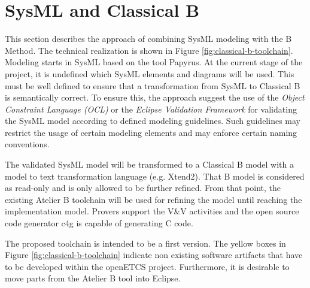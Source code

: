 \chapter{SysML and Classical B}
\label{sec:sysML-B}

This section describes the approach of combining SysML modeling with
the B Method. The technical realization is shown in Figure
\ref{fig:classical-b-toolchain}. Modeling starts in SysML based on the
tool Papyrus. At the current stage of the project, it is undefined
which SysML elements and diagrams will be used. This must be well
defined to ensure that a transformation from SysML to Classical B is
semantically correct. To ensure this, the approach suggest the use of
the \emph{Object Constraint Language (OCL)} or the \emph{Eclipse
  Validation Framework} for validating the SysML model according to
defined modeling guidelines. Such guidelines may restrict the usage of
certain modeling elements and may enforce certain naming conventions.

The validated SysML model will be transformed to a Classical B model
with a model to text transformation language (e.g. Xtend2). That B
model is considered as read-only and is only allowed to be further
refined. From that point, the existing Atelier B toolchain will be
used for refining the model until reaching the implementation
model. Provers support the V\&V activities and the open source code
generator c4g is capable of generating C code.

The proposed toolchain is intended to be a first version. The yellow
boxes in Figure \ref{fig:classical-b-toolchain} indicate non existing
software artifacts that have to be developed within the openETCS
project. Furthermore, it is desirable to move parts from the Atelier B
tool into Eclipse. 

